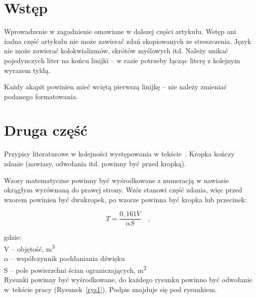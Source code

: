 \documentclass[12pt]{oska}
\affiliation{Afiliacja uczelni}
\begin{document}
\maketitles

\section{Wstęp}

Wprowadzenie w zagadnienie omawiane w dalszej części artykułu. Wstęp ani żadna część artykułu nie może zawierać zdań skopiowanych ze streszczenia. Język nie może zawierać kolokwializmów, skrótów myślowych itd. Należy unikać pojedynczych liter na końcu linijki -- w razie potrzeby łącząc literę z kolejnym wyrazem tyldą.

Każdy akapit powinien mieć wciętą pierwszą linijkę -- nie należy zmieniać podanego formatowania.

\section{Druga część}

Przypisy literaturowe w kolejności występowania w tekście~\cite{bib1}. Kropka kończy zdanie (nawiasy, odwołania itd. powinny być przed kropką).

Wzory matematyczne powinny być wyśrodkowane z numeracją w nawiasie okrągłym wyrównaną do prawej strony. Wzór stanowi część zdania, więc przed wzorem powinien być dwukropek, po wzorze powinna być kropka lub przecinek:

\begin{equation}
	T = \frac{0,161 V}{\alpha S} \quad, \label{wzor1}
\end{equation}


\noindent gdzie:\\
V -- objętość, \si{\meter\cubed}\\
$\alpha$ -- współczynnik pochłaniania dźwięku\\
S -- pole powierzchni ścian ograniczających, \si{\meter\squared}\\

Rysunki powinny być wyśrodkowane, do każdego rysunku powinno być odwołanie w~tekście pracy (Rysunek~\ref{rys1}). Podpis znajduje się pod rysunkiem.
\end{document}
